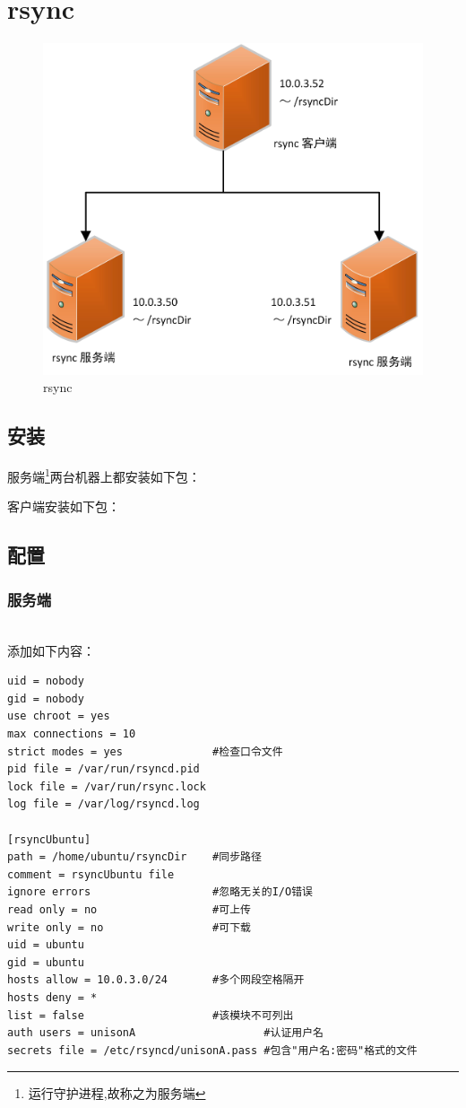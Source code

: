 \section{rsync}
\begin{figure}[h]
\centering
\includegraphics[width=\textwidth]{pic/rsync.jpg}
\caption{rsync}
\end{figure}
\subsection{安装}
服务端\footnote[1]{运行守护进程,故称之为服务端}两台机器上都安装如下包：\\
\par
客户端安装如下包：\\

\subsection{配置}
\subsubsection{服务端}
\\
添加如下内容：
\begin{verbatim}
uid = nobody
gid = nobody
use chroot = yes
max connections = 10
strict modes = yes              #检查口令文件
pid file = /var/run/rsyncd.pid
lock file = /var/run/rsync.lock
log file = /var/log/rsyncd.log

[rsyncUbuntu]
path = /home/ubuntu/rsyncDir    #同步路径
comment = rsyncUbuntu file
ignore errors                   #忽略无关的I/O错误
read only = no                  #可上传
write only = no                 #可下载
uid = ubuntu
gid = ubuntu
hosts allow = 10.0.3.0/24       #多个网段空格隔开
hosts deny = *
list = false                    #该模块不可列出
auth users = unisonA                    #认证用户名
secrets file = /etc/rsyncd/unisonA.pass #包含"用户名:密码"格式的文件
\end{verbatim}

